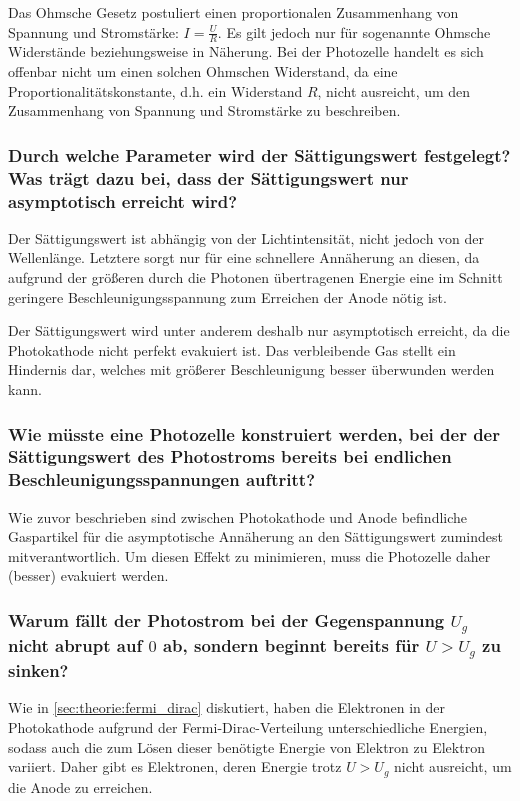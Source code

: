 Das Ohmsche Gesetz postuliert einen proportionalen Zusammenhang von Spannung und Stromstärke: $I = \frac{U}{R}$.
Es gilt jedoch nur für sogenannte Ohmsche Widerstände beziehungsweise in Näherung.
Bei der Photozelle handelt es sich offenbar nicht um einen solchen Ohmschen Widerstand,
da eine Proportionalitätskonstante, d.h. ein Widerstand $R$, nicht ausreicht,
um den Zusammenhang von Spannung und Stromstärke zu beschreiben.

\subsubsection*{Durch welche Parameter wird der Sättigungswert festgelegt?
Was trägt dazu bei, dass der Sättigungswert nur asymptotisch erreicht wird?}

Der Sättigungswert ist abhängig von der Lichtintensität,
nicht jedoch von der Wellenlänge.
Letztere sorgt nur für eine schnellere Annäherung an diesen,
da aufgrund der größeren durch die Photonen übertragenen Energie
eine im Schnitt geringere Beschleunigungsspannung zum Erreichen der Anode nötig ist.

Der Sättigungswert wird unter anderem deshalb nur asymptotisch erreicht,
da die Photokathode nicht perfekt evakuiert ist.
Das verbleibende Gas stellt ein Hindernis dar,
welches mit größerer Beschleunigung besser überwunden werden kann.

\subsubsection*{Wie müsste eine Photozelle konstruiert werden,
bei der der Sättigungswert des Photostroms bereits bei endlichen Beschleunigungsspannungen auftritt?}

Wie zuvor beschrieben
sind zwischen Photokathode und Anode befindliche Gaspartikel
für die asymptotische Annäherung an den Sättigungswert zumindest mitverantwortlich.
Um diesen Effekt zu minimieren,
muss die Photozelle daher (besser) evakuiert werden.

\subsubsection*{Warum fällt der Photostrom bei der Gegenspannung $U_g$ nicht abrupt auf $0$ ab,
sondern beginnt bereits für $U > U_g$ zu sinken?}

Wie in \autoref{sec:theorie:fermi_dirac} diskutiert,
haben die Elektronen in der Photokathode aufgrund der Fermi-Dirac-Verteilung unterschiedliche Energien,
sodass auch die zum Lösen dieser benötigte Energie von Elektron zu Elektron variiert.
Daher gibt es Elektronen,
deren Energie trotz $U > U_g$ nicht ausreicht,
um die Anode zu erreichen.

